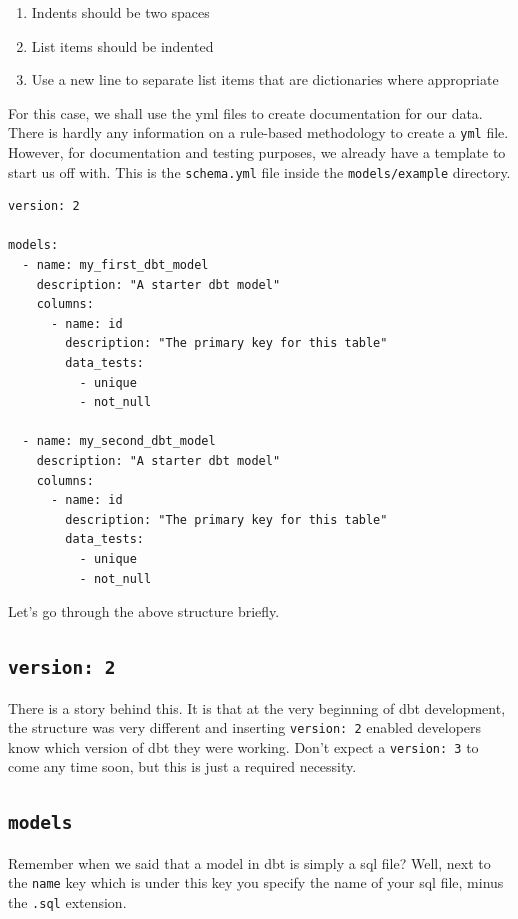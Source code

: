 \documentclass[
]{book}
\begin{document}
\begin{enumerate}
\def\labelenumi{\arabic{enumi}.}
\item
  Indents should be two spaces
\item
  List items should be indented
\item
  Use a new line to separate list items that are dictionaries where appropriate
\end{enumerate}

For this case, we shall use the yml files to create documentation for our data. There is hardly any information on a rule-based methodology to create a \texttt{yml} file. However, for documentation and testing purposes, we already have a template to start us off with. This is the \texttt{schema.yml} file inside the \texttt{models/example} directory.

\begin{verbatim}
version: 2

models:
  - name: my_first_dbt_model
    description: "A starter dbt model"
    columns:
      - name: id
        description: "The primary key for this table"
        data_tests:
          - unique
          - not_null

  - name: my_second_dbt_model
    description: "A starter dbt model"
    columns:
      - name: id
        description: "The primary key for this table"
        data_tests:
          - unique
          - not_null
\end{verbatim}

Let's go through the above structure briefly.

\hypertarget{version-2}{%
\subsection{\texorpdfstring{\texttt{version:\ 2}}{version: 2}}\label{version-2}}

There is a story behind this. It is that at the very beginning of dbt development, the structure was very different and inserting \texttt{version:\ 2} enabled developers know which version of dbt they were working. Don't expect a \texttt{version:\ 3} to come any time soon, but this is just a required necessity.

\hypertarget{models-2}{%
\subsection{\texorpdfstring{\texttt{models}}{models}}\label{models-2}}

Remember when we said that a model in dbt is simply a sql file? Well, next to the \texttt{name} key which is under this key you specify the name of your sql file, minus the \texttt{.sql} extension.
\end{document}
